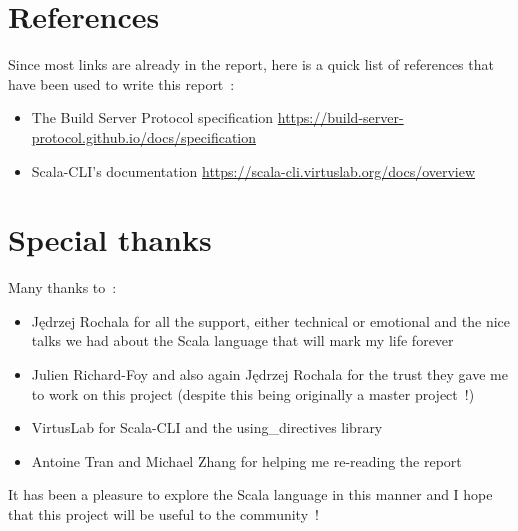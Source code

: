 \documentclass{article}
\begin{document}
\section{References}

Since most links are already in the report, here is a quick list of references that have been used to write this report~:

\begin{itemize}
    \item The Build Server Protocol specification \href{https://build-server-protocol.github.io/docs/specification}{https://build-server-protocol.github.io/docs/specification}
    \item Scala-CLI's documentation \href{https://scala-cli.virtuslab.org/docs/overview}{https://scala-cli.virtuslab.org/docs/overview}
\end{itemize}

\section{Special thanks}

Many thanks to~:

\begin{itemize}
    \item Jędrzej Rochala for all the support, either technical or emotional and the nice talks we had about the Scala language that will mark my life forever
    \item Julien Richard-Foy and also again Jędrzej Rochala for the trust they gave me to work on this project (despite this being originally a master project~!)
    \item VirtusLab for Scala-CLI and the using\_directives library
    \item Antoine Tran and Michael Zhang for helping me re-reading the report
\end{itemize}

It has been a pleasure to explore the Scala language in this manner and I hope that this project will be useful to the community~!
\end{document}
